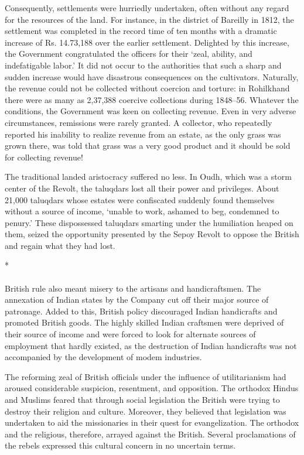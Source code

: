 \begin{multicols}{2}
Consequently, settlements were hurriedly undertaken, often without any regard for the resources of the land. For instance, in the district of Bareilly in 1812, the settlement was completed in the record time of ten months with a dramatic increase of Rs. 14.73,188 over the earlier settlement. Delighted by this increase, the Government congratulated the officers for their `zeal, ability, and indefatigable labor.' It did not occur to the authorities that such a sharp and sudden increase would have disastrous consequences on the cultivators. Naturally, the revenue could not be collected without coercion and torture: in Rohilkhand there were as many as 2,37,388 coercive collections during 1848--56. Whatever the conditions, the Government was keen on collecting revenue. Even in very adverse circumstances, remissions were rarely granted. A collector, who repeatedly reported his inability to realize revenue from an estate, as the only grass was grown there, was told that grass was a very good product and it should be sold for collecting revenue!

The traditional landed aristocracy suffered no less. In Oudh, which was a storm center of the Revolt, the taluqdars lost all their power and privileges. About 21,000 taluqdars whose estates were confiscated suddenly found themselves without a source of income, `unable to work, ashamed to beg, condemned to penury.' These dispossessed taluqdars smarting under the humiliation heaped on them, seized the opportunity presented by the Sepoy Revolt to oppose the British and regain what they had lost.

\begin{center}*\end{center}

\paragraph*{}
British rule also meant misery to the artisans and handicraftsmen. The annexation of Indian states by the Company cut off their major source of patronage. Added to this, British policy discouraged Indian handicrafts and promoted British goods. The highly skilled Indian craftsmen were deprived of their source of income and were forced to look for alternate sources of employment that hardly existed, as the destruction of Indian handicrafts was not accompanied by the development of modem industries.

The reforming zeal of British officials under the influence of utilitarianism had aroused considerable suspicion, resentment, and opposition. The orthodox Hindus and Muslims feared that through social legislation the British were trying to destroy their religion and culture. Moreover, they believed that legislation was undertaken to aid the missionaries in their quest for evangelization. The orthodox and the religious, therefore, arrayed against the British. Several proclamations of the rebels expressed this cultural concern in no uncertain terms.


\end{multicols}
